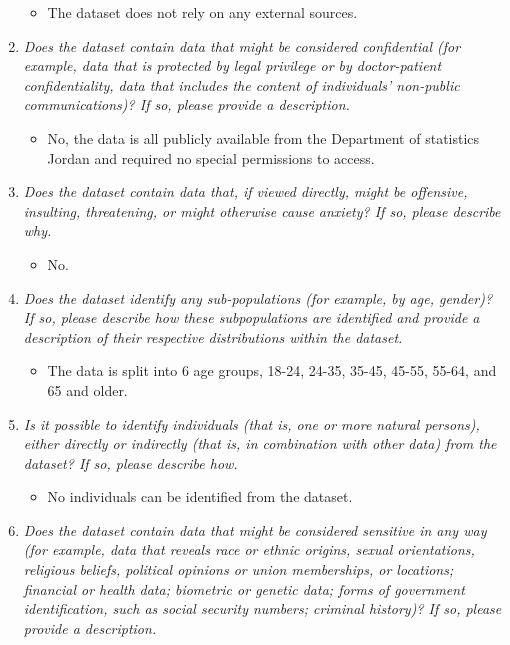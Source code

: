 \documentclass[
]{article}
\providecommand{\tightlist}{%
  \setlength{\itemsep}{0pt}\setlength{\parskip}{0pt}}
\begin{document}
\begin{enumerate}
  \begin{itemize}
  \tightlist
  \item
    The dataset does not rely on any external sources.
  \end{itemize}
\item
  \emph{Does the dataset contain data that might be considered confidential (for example, data that is protected by legal privilege or by doctor-patient confidentiality, data that includes the content of individuals' non-public communications)? If so, please provide a description.}

  \begin{itemize}
  \tightlist
  \item
    No, the data is all publicly available from the Department of statistics Jordan and required no special permissions to access.
  \end{itemize}
\item
  \emph{Does the dataset contain data that, if viewed directly, might be offensive, insulting, threatening, or might otherwise cause anxiety? If so, please describe why.}

  \begin{itemize}
  \tightlist
  \item
    No.
  \end{itemize}
\item
  \emph{Does the dataset identify any sub-populations (for example, by age, gender)? If so, please describe how these subpopulations are identified and provide a description of their respective distributions within the dataset.}

  \begin{itemize}
  \tightlist
  \item
    The data is split into 6 age groups, 18-24, 24-35, 35-45, 45-55, 55-64, and 65 and older.
  \end{itemize}
\item
  \emph{Is it possible to identify individuals (that is, one or more natural persons), either directly or indirectly (that is, in combination with other data) from the dataset? If so, please describe how.}

  \begin{itemize}
  \tightlist
  \item
    No individuals can be identified from the dataset.
  \end{itemize}
\item
  \emph{Does the dataset contain data that might be considered sensitive in any way (for example, data that reveals race or ethnic origins, sexual orientations, religious beliefs, political opinions or union memberships, or locations; financial or health data; biometric or genetic data; forms of government identification, such as social security numbers; criminal history)? If so, please provide a description.}


\end{enumerate}
\end{document}
